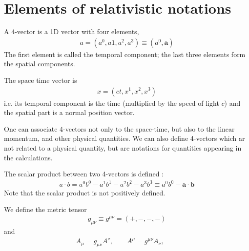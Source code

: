 \chapter{Elements of relativistic notations}



A 4-vector is a 1D vector with four elements, 
\begin{align} 
a = (a^0, a1, a^2, a^3) \equiv(a^0, {\bm a})
\end{align}
The first element is called the temporal component; the last three elements  form the spatial components.

The space time vector is 
\begin{align} 
x=(ct, x^1, x^2, x^3)
\end{align}
i.e. its temporal component is the time (multiplied by the speed of light $c$) and the spatial part is a normal position vector.

One can associate 4-vectors not only to the space-time, but also to the linear momentum, and other physical quantities. We can also define 4-vectors which ar not related to a physical quantity, but are  notations for quantities appearing in the calculations.


The scalar product between two 4-vectors is defined :
\begin{align} 
a\cdot b=a^0b^0 -a^1 b^1 -a^2 b^2 -a^3 b^3\equiv a^0b^0-{\bm a}\cdot{\bm b}
\end{align}
Note that the scalar product is not positively defined.

We define the metric tensor
\begin{align}
g_{\mu\nu}\equiv g^{\mu\nu}=(+,-,-,-)
\end{align}
and
\begin{align}
A_\mu=g_{\mu\nu}A^\nu,\qquad A^\mu=g^{\mu\nu}A_\nu,\qquad
\end{align}
